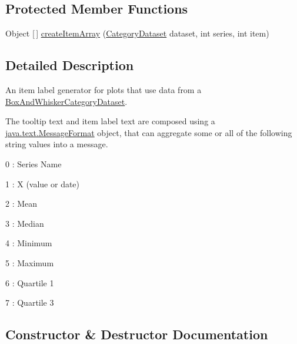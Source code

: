\subsection*{Protected Member Functions}
\begin{DoxyCompactItemize}
\item 
Object \mbox{[}$\,$\mbox{]} \mbox{\hyperlink{classorg_1_1jfree_1_1chart_1_1labels_1_1_box_and_whisker_tool_tip_generator_a56d4e6dafec5544fbf4f00be0e61f182}{create\+Item\+Array}} (\mbox{\hyperlink{interfaceorg_1_1jfree_1_1data_1_1category_1_1_category_dataset}{Category\+Dataset}} dataset, int series, int item)
\end{DoxyCompactItemize}


\subsection{Detailed Description}
An item label generator for plots that use data from a \mbox{\hyperlink{}{Box\+And\+Whisker\+Category\+Dataset}}. 

The tooltip text and item label text are composed using a \mbox{\hyperlink{}{java.\+text.\+Message\+Format}} object, that can aggregate some or all of the following string values into a message. 
\begin{DoxyItemize}
\item 0 \+: Series Name 
\item 1 \+: X (value or date) 
\item 2 \+: Mean 
\item 3 \+: Median 
\item 4 \+: Minimum 
\item 5 \+: Maximum 
\item 6 \+: Quartile 1 
\item 7 \+: Quartile 3 
\end{DoxyItemize}

\subsection{Constructor \& Destructor Documentation}
\mbox{\label{classorg_1_1jfree_1_1chart_1_1labels_1_1_box_and_whisker_tool_tip_generator_af3bfa36dda7698c61c93fe9f41e6e7de}} 
